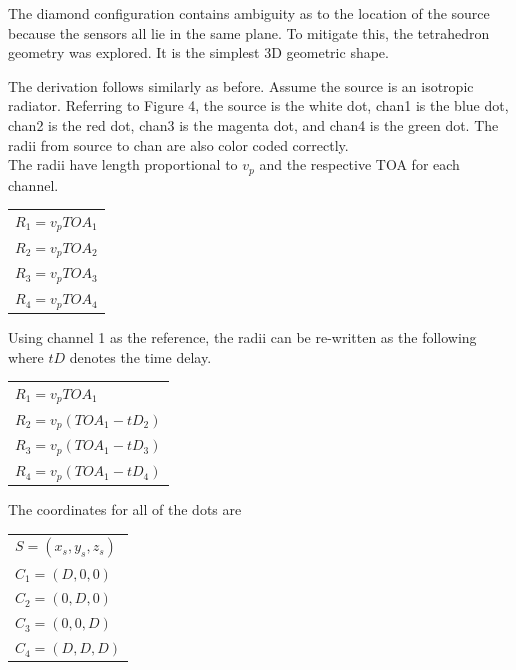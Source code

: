 \documentclass[12pt]{article}
\begin{document}
\noindent The diamond configuration contains ambiguity as to the location of the source because the sensors all lie in the same plane. To mitigate this, the tetrahedron geometry was explored. It is the simplest 3D geometric shape.

\noindent The derivation follows similarly as before. Assume the source is an isotropic radiator. Referring to Figure 4, the source is the white dot, chan1 is the blue dot, chan2 is the red dot, chan3 is the magenta dot, and chan4 is the green dot. The radii from source to chan are also color coded correctly.\\

\noindent The radii have length proportional to $v_p$ and the respective TOA for each channel.

\begin{center}
\begin{tabular}{l}
$R_1 = v_p TOA_1$\\
$R_2 = v_p TOA_2$\\
$R_3 = v_p TOA_3$\\
$R_4 = v_p TOA_4$\\
\end{tabular}
\end{center}

\noindent Using channel 1 as the reference, the radii can be re-written as the following where $tD$ denotes the time delay.

\begin{center}
\begin{tabular}{l}
$R_1 = v_p TOA_1$\\
$R_2 = v_p (TOA_1 - tD_2)$\\
$R_3 = v_p (TOA_1 - tD_3)$\\
$R_4 = v_p (TOA_1 - tD_4)$\\
\end{tabular}
\end{center}

\pagebreak
\noindent The coordinates for all of the dots are

\begin{center}
\begin{tabular}{l}
$S = (x_s,y_s,z_s)$\\
$C_1 = (D,0,0)$\\
$C_2 = (0,D,0)$\\
$C_3 = (0,0,D)$\\
$C_4 = (D,D,D)$\\
\end{tabular}
\end{center}
\end{document}
